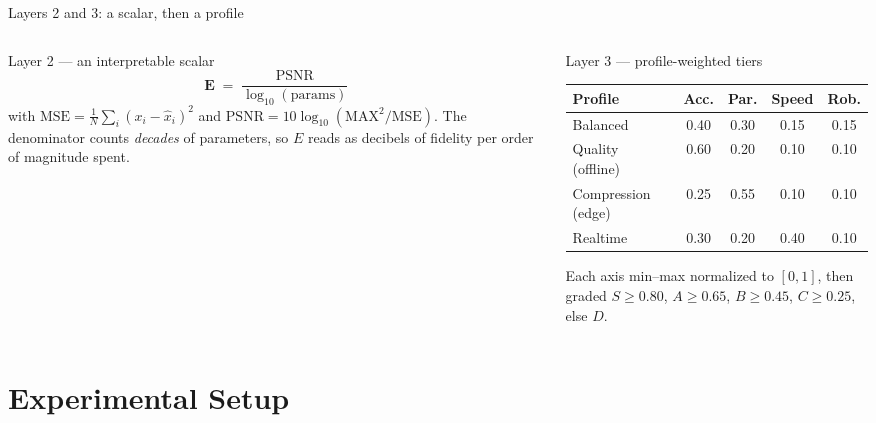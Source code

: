 \documentclass[aspectratio=169,9pt]{beamer}
\begin{document}
\begin{frame}{Layers 2 and 3: a scalar, then a profile}
\begin{columns}[T,onlytextwidth]
\begin{column}{0.44\textwidth}
\begin{block}{Layer 2 --- an interpretable scalar}
\small
\[ \mathbf{E} \;=\; \frac{\mathrm{PSNR}}{\log_{10}(\mathrm{params})} \]
with $\mathrm{MSE} = \tfrac{1}{N}\sum_i (x_i - \hat{x}_i)^2$ and
$\mathrm{PSNR} = 10\log_{10}(\mathrm{MAX}^2/\mathrm{MSE})$.
The denominator counts \emph{decades} of parameters, so $E$ reads as decibels of
fidelity per order of magnitude spent.
\end{block}
\end{column}
\begin{column}{0.52\textwidth}
\begin{block}{Layer 3 --- profile-weighted tiers}
\centering\scriptsize
\begin{tabular}{@{}lcccc@{}}
\toprule
\textbf{Profile} & \textbf{Acc.} & \textbf{Par.} & \textbf{Speed} & \textbf{Rob.}\\
\midrule
Balanced           & 0.40 & 0.30 & 0.15 & 0.15 \\
Quality (offline)  & 0.60 & 0.20 & 0.10 & 0.10 \\
Compression (edge) & 0.25 & 0.55 & 0.10 & 0.10 \\
Realtime           & 0.30 & 0.20 & 0.40 & 0.10 \\
\bottomrule
\end{tabular}

\smallskip
Each axis min--max normalized to $[0,1]$, then graded $S \geq 0.80$,
$A \geq 0.65$, $B \geq 0.45$, $C \geq 0.25$, else $D$.
\end{block}
\end{column}
\end{columns}
\end{frame}

\section{Experimental Setup}
\end{document}
